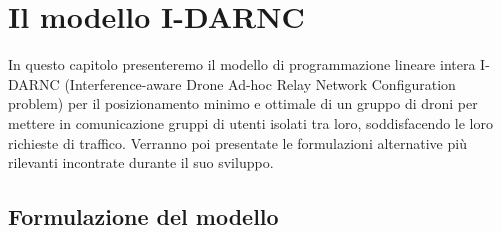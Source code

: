  \chapter{Il modello I-DARNC} \label{chap:modello}
 In questo capitolo presenteremo il modello di programmazione lineare intera I-DARNC (Interference-aware Drone Ad-hoc Relay Network Configuration problem) per il posizionamento minimo e ottimale di un gruppo di droni per mettere in comunicazione gruppi di utenti isolati tra loro, soddisfacendo le loro richieste di traffico. Verranno poi presentate le formulazioni alternative più rilevanti incontrate durante il suo sviluppo.\\

\ifpdf
    \graphicspath{{Chapter5/Figs/Raster/}{Chapter5/Figs/PDF/}{Chapter5/Figs/}}
\else
    \graphicspath{{Chapter5/Figs/Vector/}{Chapter5/Figs/}}
\fi

\section{Formulazione del modello}

